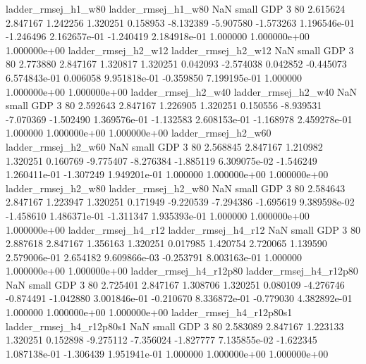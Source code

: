      ladder_rmsej_h1_w80      ladder_rmsej_h1_w80                   NaN      small      GDP                 3 80 2.615624       2.847167 1.242256       1.320251    0.158953     -8.132389     -5.907580    -1.573263   1.196546e-01 -1.246496 2.162657e-01    -1.240419   2.184918e-01            1.000000    1.000000e+00        1.000000e+00
     ladder_rmsej_h2_w12      ladder_rmsej_h2_w12                   NaN      small      GDP                 3 80 2.773880       2.847167 1.320817       1.320251    0.042093     -2.574038      0.042852    -0.445073   6.574843e-01  0.006058 9.951818e-01    -0.359850   7.199195e-01            1.000000    1.000000e+00        1.000000e+00
     ladder_rmsej_h2_w40      ladder_rmsej_h2_w40                   NaN      small      GDP                 3 80 2.592643       2.847167 1.226905       1.320251    0.150556     -8.939531     -7.070369    -1.502490   1.369576e-01 -1.132583 2.608153e-01    -1.168978   2.459278e-01            1.000000    1.000000e+00        1.000000e+00
     ladder_rmsej_h2_w60      ladder_rmsej_h2_w60                   NaN      small      GDP                 3 80 2.568845       2.847167 1.210982       1.320251    0.160769     -9.775407     -8.276384    -1.885119   6.309075e-02 -1.546249 1.260411e-01    -1.307249   1.949201e-01            1.000000    1.000000e+00        1.000000e+00
     ladder_rmsej_h2_w80      ladder_rmsej_h2_w80                   NaN      small      GDP                 3 80 2.584643       2.847167 1.223947       1.320251    0.171949     -9.220539     -7.294386    -1.695619   9.389598e-02 -1.458610 1.486371e-01    -1.311347   1.935393e-01            1.000000    1.000000e+00        1.000000e+00
     ladder_rmsej_h4_r12      ladder_rmsej_h4_r12                   NaN      small      GDP                 3 80 2.887618       2.847167 1.356163       1.320251    0.017985      1.420754      2.720065     1.139590   2.579006e-01  2.654182 9.609866e-03    -0.253791   8.003163e-01            1.000000    1.000000e+00        1.000000e+00
  ladder_rmsej_h4_r12p80   ladder_rmsej_h4_r12p80                   NaN      small      GDP                 3 80 2.725401       2.847167 1.308706       1.320251    0.080109     -4.276746     -0.874491    -1.042880   3.001846e-01 -0.210670 8.336872e-01    -0.779030   4.382892e-01            1.000000    1.000000e+00        1.000000e+00
ladder_rmsej_h4_r12p80s1 ladder_rmsej_h4_r12p80s1                   NaN      small      GDP                 3 80 2.583089       2.847167 1.223133       1.320251    0.152898     -9.275112     -7.356024    -1.827777   7.135855e-02 -1.622345 1.087138e-01    -1.306439   1.951941e-01            1.000000    1.000000e+00        1.000000e+00
